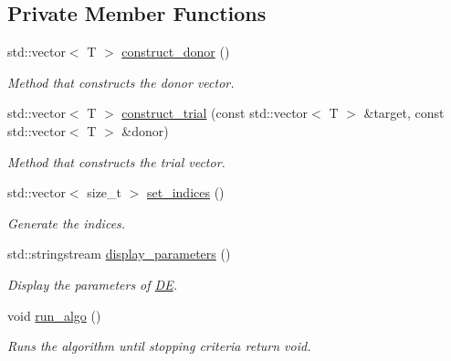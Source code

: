 \subsection*{Private Member Functions}
\begin{DoxyCompactItemize}
\item 
std\+::vector$<$ T $>$ \hyperlink{classea_1_1_solver_3_01_d_e_00_01_t_00_01_f_00_01_c_01_4_a69dabdddba116ddb5685355119bd77e0}{construct\+\_\+donor} ()
\begin{DoxyCompactList}\small\item\em Method that constructs the donor vector. \end{DoxyCompactList}\item 
std\+::vector$<$ T $>$ \hyperlink{classea_1_1_solver_3_01_d_e_00_01_t_00_01_f_00_01_c_01_4_a043f8134c53f09519283b8320d7a2ade}{construct\+\_\+trial} (const std\+::vector$<$ T $>$ \&target, const std\+::vector$<$ T $>$ \&donor)
\begin{DoxyCompactList}\small\item\em Method that constructs the trial vector. \end{DoxyCompactList}\item 
std\+::vector$<$ size\+\_\+t $>$ \hyperlink{classea_1_1_solver_3_01_d_e_00_01_t_00_01_f_00_01_c_01_4_a86a25b0977865969248efd4e79e4982f}{set\+\_\+indices} ()
\begin{DoxyCompactList}\small\item\em Generate the indices. \end{DoxyCompactList}\item 
std\+::stringstream \hyperlink{classea_1_1_solver_3_01_d_e_00_01_t_00_01_f_00_01_c_01_4_a122c904c555a0be3b27160d6f883fd1b}{display\+\_\+parameters} ()
\begin{DoxyCompactList}\small\item\em Display the parameters of \hyperlink{structea_1_1_d_e}{DE}. \end{DoxyCompactList}\item 
void \hyperlink{classea_1_1_solver_3_01_d_e_00_01_t_00_01_f_00_01_c_01_4_a6e560e4d8fb8f578ebe0fd7beb802632}{run\+\_\+algo} ()
\begin{DoxyCompactList}\small\item\em Runs the algorithm until stopping criteria return void. \end{DoxyCompactList}\end{DoxyCompactItemize}
